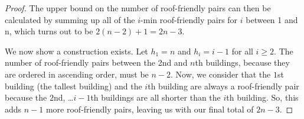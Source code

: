 \documentclass[10pt]{../usamts}
\begin{document}
\begin{solution}
\begin{proof}
    The upper bound on the number of roof-friendly pairs can then be calculated by summing up all of the $i$-min roof-friendly pairs for $i$ between 1 and n, which turns out to be $2(n-2) + 1 = 2n-3$.
    
    We now show a construction exists. Let $h_1 = n$ and $h_i = i-1$ for all $i \ge 2$. The number of roof-friendly pairs between the 2nd and $n$th buildings, because they are ordered in ascending order, must be $n-2$. Now, we consider that the $1$st building (the tallest building) and the $i$th building are always a roof-friendly pair because the $2$nd, \dots $i-1$th buildings are all shorter than the $i$th building. So, this adds $n-1$ more roof-friendly pairs, leaving us with our final total of $2n-3$.
\end{proof}

\end{solution}
\end{document}
